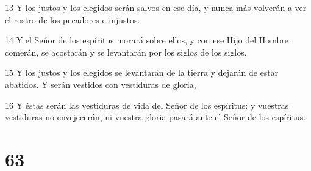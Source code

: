 \par 13 Y los justos y los elegidos serán salvos en ese día, y nunca más volverán a ver el rostro de los pecadores e injustos.
\par 14 Y el Señor de los espíritus morará sobre ellos, y con ese Hijo del Hombre comerán, se acostarán y se levantarán por los siglos de los siglos.
\par 15 Y los justos y los elegidos se levantarán de la tierra y dejarán de estar abatidos. Y serán vestidos con vestiduras de gloria,
\par 16 Y éstas serán las vestiduras de vida del Señor de los espíritus: y vuestras vestiduras no envejecerán, ni vuestra gloria pasará ante el Señor de los espíritus.

\chapter{63}

